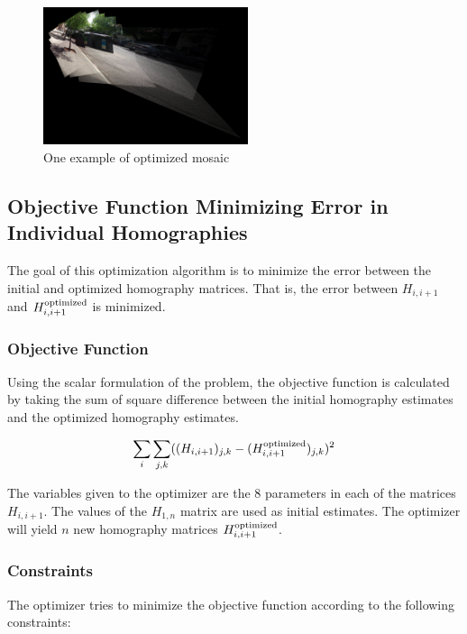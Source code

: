 \documentclass{article}
\begin{document}
\begin{figure}[h!]
\centering
\includegraphics[width=6cm]{testset16test9/cummosaic0016_edit.jpg}
\caption{One example of optimized mosaic}
\end{figure}

\subsection{Objective Function Minimizing Error in Individual Homographies}

The goal of this optimization algorithm is to minimize the error between the
initial and optimized homography matrices. That is, the error between 
$H_{i, i + 1}$ and $H_{i, i+1}^{\textnormal{optimized}}$ is minimized.

\subsubsection{Objective Function}

Using the scalar formulation of the problem, the objective function is
calculated by taking the sum of square difference between the initial
homography estimates and the optimized homography estimates. 

\[\sum_i \sum_{j, k} ((H_{i, i + 1})_{j, k} - (H_{i, i + 1}^{\textnormal{optimized}})_{j, k})^2\] 

The variables given to the optimizer are the 8 parameters in each of the
matrices $H_{i, i + 1}$. The values of the $H_{1, n}$ matrix are used as
initial estimates. The optimizer will yield $n$ new homography matrices $H_{i,
i + 1}^{\textnormal{optimized}}$. 

\subsubsection{Constraints}

The optimizer tries to minimize the objective function according to the
following constraints:
\end{document}
